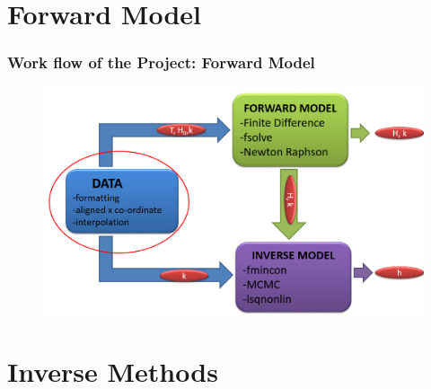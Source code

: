 \documentclass[7pt]{beamer}
\begin{document}
\section{Forward Model}
\begin{frame}
 \frametitle{Work flow of the Project: Forward Model}



\begin{figure}[H]
	 	\centering
	 	\includegraphics[width=1.0\linewidth]{img/Focus_D.png}
	 	\end{figure}

\end{frame}



\section{Inverse Methods}
\end{document}
